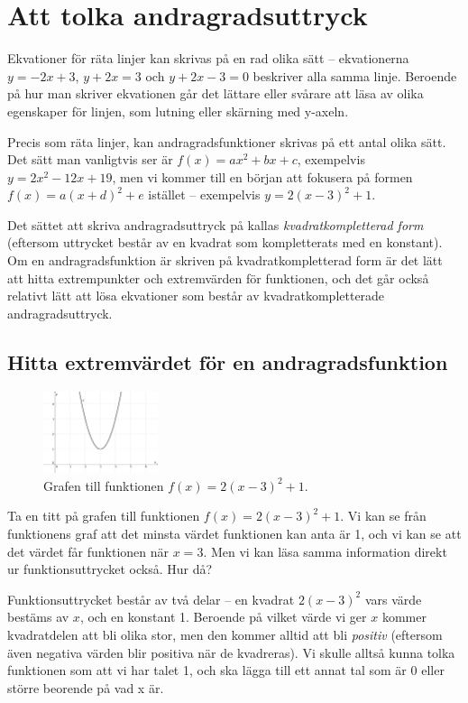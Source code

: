 \section{Att tolka andragradsuttryck}

Ekvationer för räta linjer kan skrivas på en rad olika sätt -- ekvationerna $y = -2x + 3$, $y + 2x = 3$ och $y + 2x - 3 = 0$ beskriver alla samma linje.
Beroende på hur man skriver ekvationen går det lättare eller svårare att läsa av olika egenskaper för linjen, som lutning eller skärning med y-axeln.

Precis som räta linjer, kan andragradsfunktioner skrivas på ett antal olika sätt.
Det sätt man vanligtvis ser är \mbox{$f(x) = ax^2 + bx + c$}, exempelvis $y=2x^2 - 12x + 19$, men vi kommer till en början att fokusera på formen \mbox{$f(x) = a(x+d)^2+e$} istället -- exempelvis $y=2(x-3)^2+1$.

Det sättet att skriva andragradsuttryck på kallas \emph{kvadratkompletterad form} (eftersom uttrycket består av en kvadrat som kompletterats med en konstant).
Om en andragradsfunktion är skriven på kvadratkompletterad form är det lätt att hitta extrempunkter och extremvärden för funktionen, och det går också relativt lätt att lösa ekvationer som består av kvadratkompletterade andragradsuttryck.

\subsection{Hitta extremvärdet för en andragradsfunktion}

\begin{figure}
  \centering
  \includegraphics[width=0.3\textwidth]{bilder/poskurva1.png}
  \caption{\label{fig:poskurva1}Grafen till funktionen $f(x)=2(x-3)^2+1$.}
\end{figure}

Ta en titt på grafen till funktionen $f(x) = 2(x-3)^2+1$.
Vi kan se från funktionens graf att det minsta värdet funktionen kan anta är 1, och vi kan se att det värdet får funktionen när $x=3$.
Men vi kan läsa samma information direkt ur funktionsuttrycket också. Hur då?

Funktionsuttrycket består av två delar -- en kvadrat $2(x-3)^2$ vars värde bestäms av $x$, och en konstant 1.
Beroende på vilket värde vi ger $x$ kommer kvadratdelen att bli olika stor, men den kommer alltid att bli \emph{positiv} (eftersom även negativa värden blir positiva när de kvadreras).
Vi skulle alltså kunna tolka funktionen som att vi har talet 1, och ska lägga till ett annat tal som är 0 eller större beorende på vad x är.


